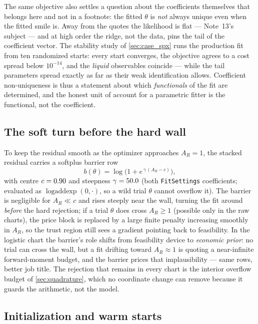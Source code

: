 \documentclass[11pt]{article}
\begin{document}
The same objective also settles a question about the coefficients
themselves that belongs here and not in a footnote: the fitted
$\theta$ is \emph{not} always unique even when the fitted smile is.
Away from the quotes the likelihood is flat --- Note~13's subject --- and
at high order the ridge, not the data, pins the tail of the coefficient
vector.  The stability study of \cref{sec:case_spx} runs the production
fit from ten randomized starts: every start converges, the objective agrees
to a cost spread below $10^{-14}$, and the \emph{liquid} observables
coincide --- while the tail parameters spread exactly as far as their weak
identification allows.  Coefficient non-uniqueness is thus a statement
about which \emph{functionals} of the fit are determined, and the honest
unit of account for a parametric fitter is the functional, not the
coefficient.

\subsection{The soft turn before the hard wall}

To keep the residual smooth as the optimizer approaches $A_R=1$, the stacked
residual carries a softplus barrier row
\begin{equation}
b(\theta)=\log\!\big(1+e^{\,\gamma\,(A_R-c)}\big),
\label{eq:barrier}
\end{equation}
with centre $c=0.90$ and steepness $\gamma=50.0$
(both \texttt{FitSettings} coefficients; evaluated as
$\operatorname{logaddexp}(0,\cdot)$, so a wild trial $\theta$ cannot overflow
it).  The barrier is negligible for $A_R\ll c$ and rises steeply near the
wall, turning the fit around \emph{before} the hard rejection; if a trial
$\theta$ does cross $A_R\ge1$ (possible only in the raw charts), the price
block is replaced by a large finite penalty increasing smoothly in $A_R$,
so the trust region still sees a gradient pointing back to feasibility.  In
the logistic chart the barrier's role shifts from feasibility device to
\emph{economic prior}: no trial can cross the wall, but a fit drifting
toward $A_R\approx1$ is quoting a near-infinite forward-moment budget, and
the barrier prices that implausibility --- same rows, better job title.
The rejection that remains in every chart is the interior overflow budget
of \cref{sec:quadrature}, which no coordinate change can remove because it
guards the arithmetic, not the model.

\subsection{Initialization and warm starts}
\end{document}
